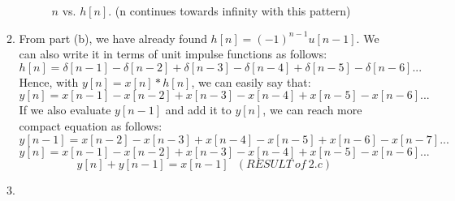 \documentclass[10pt,a4paper, margin=1in]{article}
\begin{document}
\begin{enumerate}
\begin{enumerate}
      \begin{figure} [h!]
    \centering
    \caption{$n$ vs. $h[n]$. (n continues towards infinity with this pattern)}
    \label{fig:q2b_1}
\end{figure}
    \item %
    From part (b), we have already found $h[n] = (-1)^{n-1}u[n-1]$. We can also write it in terms of unit impulse functions as follows:
     \[ h[n] = \delta[n-1] - \delta[n-2] + \delta[n-3] - \delta[n-4] + \delta[n-5] - \delta[n-6] ... \]
     Hence, with $y[n] = x[n] * h[n]$, we can easily say that:
     \[ y[n] =  x[n-1] - x[n-2] + x[n-3] - x[n-4] + x[n-5] - x[n-6] ... \]
     If we also evaluate $y[n-1]$ and add it to $y[n]$,  we can reach more compact equation as follows: \\
    \[ y[n-1] = x[n-2] - x[n-3] + x[n-4] - x[n-5] + x[n-6] - x[n-7] ... \]
     \[  y[n] =  x[n-1] - x[n-2] + x[n-3] - x[n-4] + x[n-5] - x[n-6] ...\]
     \[ y[n] + y[n-1] = x[n-1] \ \ \ (RESULT \ of \ 2.c) \] 
    \item %
    
	\newcommand{\suma}{\Large$+$}
	\newcommand{\delay}{$D$}
	\newcommand{\derv}{\huge$\frac{d}{dt}$}
	

\end{enumerate}
\end{enumerate}
\end{document}
